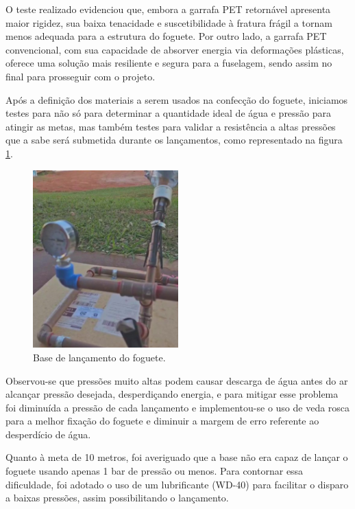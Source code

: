 O teste realizado evidenciou que, embora a garrafa PET retornável apresenta maior rigidez, sua baixa tenacidade e suscetibilidade à fratura frágil a tornam menos adequada para a estrutura do foguete. Por outro lado, a garrafa PET convencional, com sua capacidade de absorver energia via deformações plásticas, oferece uma solução mais resiliente e segura para a fuselagem, sendo assim no final para prosseguir com o projeto.

Após a definição dos materiais a serem usados na confecção do foguete, iniciamos testes para não só para determinar a quantidade ideal de água e pressão para atingir as metas, mas também testes para validar a resistência a altas pressões que a sabe será submetida durante os lançamentos, como representado na figura \ref{fig_base_lancamento_perto}.

\begin{figure}[H]
	\centering
	\includegraphics[width=0.5\textwidth,height=\textheight,keepaspectratio]{figuras/estruturas/base_perto.png}
	\caption{Base de lançamento do foguete.}
	\label{fig_base_lancamento_perto}
\end{figure}

Observou-se que pressões muito altas podem causar descarga de água antes do ar alcançar pressão desejada, desperdiçando energia, e para mitigar esse problema foi diminuída a pressão de cada lançamento e implementou-se o uso de veda rosca para a melhor fixação do foguete e diminuir a margem de erro referente ao desperdício de água. 

Quanto à meta de 10 metros, foi averiguado que a base não era capaz de lançar o foguete usando apenas 1 bar de pressão ou menos. Para contornar essa dificuldade, foi adotado o uso de um lubrificante (WD-40) para facilitar o disparo a baixas pressões, assim possibilitando o lançamento. 

